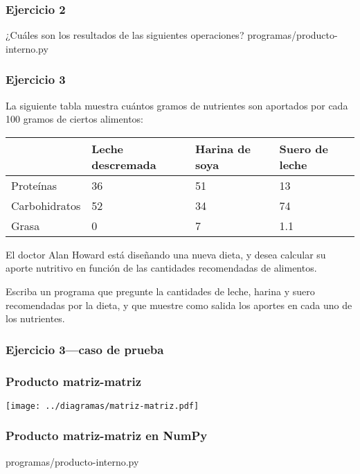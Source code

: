 \documentclass[12pt]{beamer}
\begin{document}
  \begin{frame}
    \label{ejercicios-producto-matriz-vector}
    \frametitle{Ejercicio 2}
    ¿Cuáles son los resultados
    de las siguientes operaciones?
        {programas/producto-interno.py}
  \end{frame}

  \begin{frame}
    \label{ejercicio-nutrientes}
    \frametitle{Ejercicio 3}
    La siguiente tabla muestra cuántos gramos de nutrientes
    son aportados por cada 100 gramos de ciertos alimentos:
    \vspace{2ex}

    {\footnotesize
    \begin{tabular}{lp{6em}p{6em}p{4.5em}}
      & \raggedright Leche descremada & \raggedright Harina de soya & {\raggedright Suero de leche} \\\hline
      Proteínas     &  36 &   51 &   13  \\\hline
      Carbohidratos &  52 &   34 &   74  \\\hline
      Grasa         &   0 &    7 &  1.1  \\\hline
    \end{tabular}}

    \vspace{2ex}
    El doctor Alan Howard está diseñando una nueva dieta,
    y desea calcular su aporte nutritivo
    en función de las cantidades recomendadas de alimentos.

    \vspace{2ex}
    Escriba un programa que pregunte la cantidades de leche, harina y suero
    recomendadas por la dieta, y que muestre como salida
    los aportes en cada uno de los nutrientes.
  \end{frame}

  \begin{frame}
    \label{caso-nutrientes}
    \frametitle{Ejercicio 3---caso de prueba}
    
  \end{frame}

  \begin{frame}
    \label{producto-matriz-matriz}
    \frametitle{Producto matriz-matriz}
    \texttt{[image: ../diagramas/matriz-matriz.pdf]}
  \end{frame}

  \begin{frame}
    \label{producto-matriz-matriz-numpy}
    \frametitle{Producto matriz-matriz en NumPy}
    
        {programas/producto-interno.py}
  \end{frame}
\end{document}
